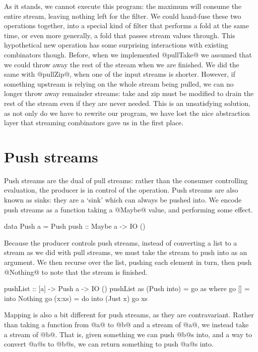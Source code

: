 As it stands, we cannot execute this program: the maximum will consume the entire stream, leaving nothing left for the filter.
We could hand-fuse these two operations together, into a special kind of filter that performs a fold at the same time, or even more generally, a fold that passes stream values through.
This hypothetical new operation has some surprising interactions with existing combinators though.
Before, when we implemented @pullTake@ we assumed that we could throw away the rest of the stream when we are finished. We did the same with @pullZip@, when one of the input streams is shorter.
However, if something upstream is relying on the whole stream being pulled, we can no longer throw away remainder streams: take and zip must be modified to drain the rest of the stream even if they are never needed.
This is an unsatisfying solution, as not only do we have to rewrite our program, we have lost the nice abstraction layer that streaming combinators gave us in the first place.


\section{Push streams}

Push streams are the dual of pull streams: rather than the consumer controlling evaluation, the producer is in control of the operation.
Push streams are also known as sinks: they are a `sink' which can always be pushed into.
We encode push streams as a function taking a @Maybe@ value, and performing some effect.

\begin{code}
data Push a
  = Push
  { push :: Maybe a -> IO () }
\end{code}

Because the producer controls push streams, instead of converting a list to a stream as we did with pull streams, we must take the stream to push into as an argument.
We then recurse over the list, pushing each element in turn, then push @Nothing@ to note that the stream is finished.

\begin{code}
pushList :: [a] -> Push a -> IO ()
pushList as (Push into) = go as
 where
  go [] = into Nothing
  go (x:xs) = do
    into (Just x)
    go xs
\end{code}

Mapping is also a bit different for push streams, as they are contravariant. Rather than taking a function from @a@ to @b@ and a stream of @a@, we instead take a stream of @b@.
That is, given something we can push @b@s into, and a way to convert @a@s to @b@s, we can return something to push @a@s into.

